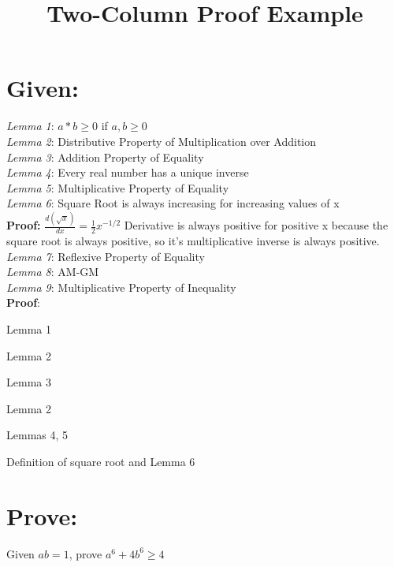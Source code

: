 \documentclass[11pt]{article}
\title{Two-Column Proof Example}
\begin{document}
\section*{Given:}

\emph{Lemma 1}: $a*b \geq 0$ if $a,b \geq 0$\\
\emph{Lemma 2}: Distributive Property of Multiplication over Addition\\
\emph{Lemma 3}: Addition Property of Equality\\
\emph{Lemma 4}: Every real number has a unique inverse\\
\emph{Lemma 5}: Multiplicative Property of Equality\\
\emph{Lemma 6}: Square Root is always increasing for increasing values of x\\
\textbf{Proof:} $\frac{d(\sqrt{x})}{dx} = \frac{1}{2}x^{-1/2}$ Derivative is always positive for positive x because the square root is always positive, so it's multiplicative inverse is always positive.\\
\emph{Lemma 7}: Reflexive Property of Equality\\
\emph{Lemma 8}: AM-GM \\
\emph{Lemma 9}: Multiplicative Property of Inequality\\
\textbf{Proof}:
\begin{TwoColumnProof}
{Lemma 1}

{Lemma 2}

{Lemma 3}

{Lemma 2}

{Lemmas 4, 5}

{Definition of square root and Lemma 6}




\end{TwoColumnProof}

\section*{Prove:}
Given $ab=1$, prove $a^6+4b^6 \geq 4$

\begin{TwoColumnProof}






    
\end{TwoColumnProof}
\end{document}
